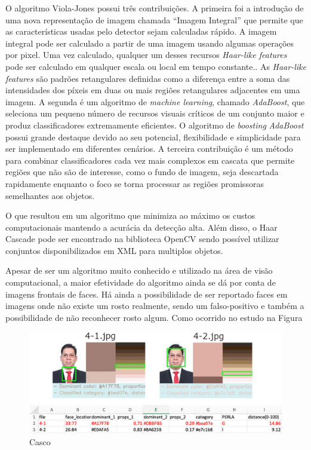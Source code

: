O algoritmo Viola-Jones possui três contribuições. A primeira
foi a introdução de uma nova representação de imagem chamada
“Imagem Integral” que permite que as características usadas pelo detector sejam calculadas rápido. A imagem integral pode ser
calculado a partir de uma imagem usando algumas operações por pixel. Uma vez calculado, qualquer um desses recursos \textit{Haar-like features} pode ser calculado em qualquer escala ou local em tempo constante.\cite{Viola-Jones}. As \textit{Haar-like features} são padrões retangulares definidas como a diferença entre a soma das intensidades dos píxeis em duas ou mais regiões retangulares adjacentes em uma imagem. 
A segunda é um algoritmo de \textit{machine learning}, chamado \textit{AdaBoost}, que seleciona um pequeno número de recursos visuais críticos de um conjunto maior e produz classificadores extremamente eficientes. O algoritmo de \textit{boosting} \textit{AdaBoost} possui grande destaque devido ao seu potencial, flexibilidade e simplicidade para ser implementado em diferentes cenários. A terceira contribuição é um método para combinar classificadores cada vez mais complexos em cascata que permite regiões que não são de interesse, como o fundo de imagem, seja descartada rapidamente enquanto o foco se torna processar as regiões promissoras semelhantes aos objetos.

O que resultou em um algoritmo que minimiza ao máximo os custos computacionais mantendo a acurácia da detecção alta\cite{Viola-Jones}. Além disso, o Haar Cascade pode ser encontrado
na biblioteca OpenCV sendo possível utilizar conjuntos disponibilizados em XML para multiplos objetos.

Apesar de ser um algoritmo muito conhecido e utilizado na área de visão computacional, a maior efetividade do algoritmo ainda se dá por conta de imagens frontais de faces. Há ainda a possibilidade de ser reportado faces em imagens onde não existe um rosto realmente, sendo um falso-positivo e também a possibilidade de não reconhecer rosto algum. Como ocorrido no estudo \cite{Classification_Algorithm_for_Skin_Color_CASCo_A_new_tool} na Figura 

\begin{figure}[h]
\caption{Casco }
\centering

\includegraphics[]{Template_Latex_TCC-UNIFTEC/_lib/imagens/casco.jpg}

\label{fig:x casco-miss-identification}
\end{figure}
